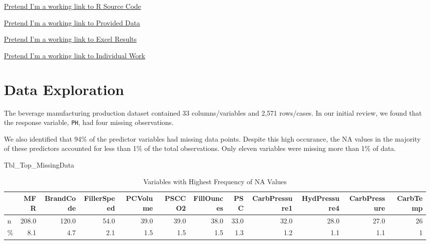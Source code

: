 \documentclass[]{report}
\newenvironment{Shaded}{\begin{snugshade}}{\end{snugshade}}
\newcommand{\NormalTok}[1]{#1}
\begin{document}
\begin{compactitem}
  \item \href{https://github.com/JeremyOBrien16/CUNY_DATA_624/tree/master/Project_Two}{Pretend I'm a working link to R Source Code}
  \item \href{https://github.com/JeremyOBrien16/CUNY_DATA_624/tree/master/Project_Two}{Pretend I'm a working link to Provided Data}
  \item \href{https://github.com/JeremyOBrien16/CUNY_DATA_624/tree/master/Project_Two}{Pretend I'm a working link to Excel Results}
  \item \href{https://github.com/JeremyOBrien16/CUNY_DATA_624/tree/master/Project_Two}{Pretend I'm a working link to Individual Work}
\end{compactitem}

\hypertarget{data-exploration}{%
\chapter{Data Exploration}\label{data-exploration}}

The beverage manufacturing production dataset contained 33
columns/variables and 2,571 rows/cases. In our initial review, we found
that the response variable, \texttt{PH}, had four missing observations.

We also identified that 94\% of the predictor variables had missing data
points. Despite this high occurance, the NA values in the majority of
these predictors accounted for less than 1\% of the total observations.
Only eleven variables were missing more than 1\% of data.

\begin{Shaded}
\begin{Highlighting}[]
\NormalTok{Tbl_Top_MissingData}
\end{Highlighting}
\end{Shaded}

\begin{table}[H]

\caption{\label{tab:source-script}Variables with Highest Frequency of NA Values}
\centering
\fontsize{8}{10}\selectfont
\begin{tabular}{lrrrrrrrrrrr}
\toprule
\textbf{ } & \textbf{MFR} & \textbf{BrandCode} & \textbf{FillerSpeed} & \textbf{PCVolume} & \textbf{PSCCO2} & \textbf{FillOunces} & \textbf{PSC} & \textbf{CarbPressure1} & \textbf{HydPressure4} & \textbf{CarbPressure} & \textbf{CarbTemp}\\
\midrule
\rowcolor{gray!6}  n & 208.0 & 120.0 & 54.0 & 39.0 & 39.0 & 38.0 & 33.0 & 32.0 & 28.0 & 27.0 & 26\\
\% & 8.1 & 4.7 & 2.1 & 1.5 & 1.5 & 1.5 & 1.3 & 1.2 & 1.1 & 1.1 & 1\\
\bottomrule
\end{tabular}
\end{table}
\end{document}
